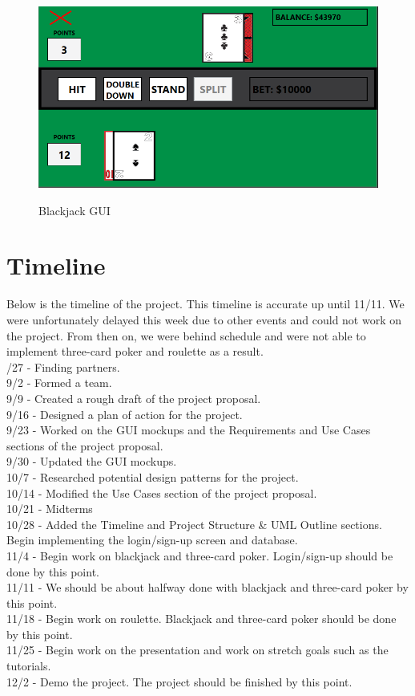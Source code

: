 \documentclass[10pt,conference,onecolumn,compsoc]{IEEEtran}
\begin{document}
\newpage

\begin{figure}[h]
\caption{Blackjack GUI}
\includegraphics[scale=0.7]{Black_jack}
\label{fig:blackjack}
\centering
\end{figure}

\newpage

\section{Timeline}
\noindent
Below is the timeline of the project. This timeline is accurate up until 11/11. We were unfortunately delayed this week due to other events and could not work on the project. From then on, we were behind schedule and were not able to implement three-card poker and roulette as a result.\\
/27 - Finding partners.\\
9/2 - Formed a team.\\
9/9 - Created a rough draft of the project proposal.\\
9/16 - Designed a plan of action for the project.\\
9/23 - Worked on the GUI mockups and the Requirements and Use Cases sections of the project proposal.\\
9/30 - Updated the GUI mockups.\\
10/7 - Researched potential design patterns for the project.\\
10/14 - Modified the Use Cases section of the project proposal.\\
10/21 - Midterms\\
10/28 - Added the Timeline and Project Structure \& UML Outline sections. Begin implementing the login/sign-up screen and database.\\
11/4 - Begin work on blackjack and three-card poker. Login/sign-up should be done by this point.\\
11/11 - We should be about halfway done with blackjack and three-card poker by this point.\\
11/18 - Begin work on roulette. Blackjack and three-card poker should be done by this point.\\
11/25 - Begin work on the presentation and work on stretch goals such as the tutorials.\\
12/2 - Demo the project. The project should be finished by this point.\\
\end{document}
